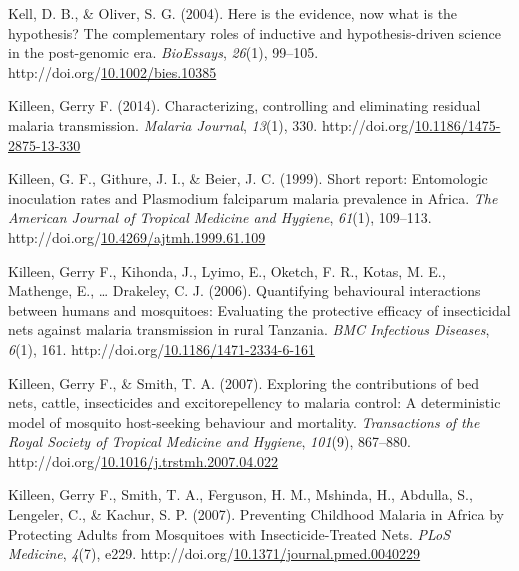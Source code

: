 \documentclass[12pt,twoside]{reedthesis}
\newlength{\cslhangindent}
\newenvironment{CSLReferences}[2] %
 {%
  \setlength{\parindent}{0pt}
  \ifodd #1 \everypar{\setlength{\hangindent}{\cslhangindent}}\ignorespaces\fi
  \ifnum #2 > 0
  \setlength{\parskip}{#2\baselineskip}
  \fi
 }%
 {}
\begin{document}
\begin{CSLReferences}{1}{0}
\leavevmode{}%
Kell, D. B., \& Oliver, S. G. (2004). Here is the evidence, now what is the hypothesis? {The} complementary roles of inductive and hypothesis-driven science in the post-genomic era. \emph{BioEssays}, \emph{26}(1), 99--105. http://doi.org/\href{https://doi.org/10.1002/bies.10385}{10.1002/bies.10385}

\leavevmode{}%
Killeen, Gerry F. (2014). Characterizing, controlling and eliminating residual malaria transmission. \emph{Malaria Journal}, \emph{13}(1), 330. http://doi.org/\href{https://doi.org/10.1186/1475-2875-13-330}{10.1186/1475-2875-13-330}

\leavevmode{}%
Killeen, G. F., Githure, J. I., \& Beier, J. C. (1999). Short report: Entomologic inoculation rates and {Plasmodium} falciparum malaria prevalence in {Africa}. \emph{The American Journal of Tropical Medicine and Hygiene}, \emph{61}(1), 109--113. http://doi.org/\href{https://doi.org/10.4269/ajtmh.1999.61.109}{10.4269/ajtmh.1999.61.109}

\leavevmode{}%
Killeen, Gerry F., Kihonda, J., Lyimo, E., Oketch, F. R., Kotas, M. E., Mathenge, E., \ldots{} Drakeley, C. J. (2006). Quantifying behavioural interactions between humans and mosquitoes: {Evaluating} the protective efficacy of insecticidal nets against malaria transmission in rural {Tanzania}. \emph{BMC Infectious Diseases}, \emph{6}(1), 161. http://doi.org/\href{https://doi.org/10.1186/1471-2334-6-161}{10.1186/1471-2334-6-161}

\leavevmode{}%
Killeen, Gerry F., \& Smith, T. A. (2007). Exploring the contributions of bed nets, cattle, insecticides and excitorepellency to malaria control: A deterministic model of mosquito host-seeking behaviour and mortality. \emph{Transactions of the Royal Society of Tropical Medicine and Hygiene}, \emph{101}(9), 867--880. http://doi.org/\href{https://doi.org/10.1016/j.trstmh.2007.04.022}{10.1016/j.trstmh.2007.04.022}

\leavevmode{}%
Killeen, Gerry F., Smith, T. A., Ferguson, H. M., Mshinda, H., Abdulla, S., Lengeler, C., \& Kachur, S. P. (2007). Preventing {Childhood} {Malaria} in {Africa} by {Protecting} {Adults} from {Mosquitoes} with {Insecticide}-{Treated} {Nets}. \emph{PLoS Medicine}, \emph{4}(7), e229. http://doi.org/\href{https://doi.org/10.1371/journal.pmed.0040229}{10.1371/journal.pmed.0040229}


\end{CSLReferences}
\end{document}
